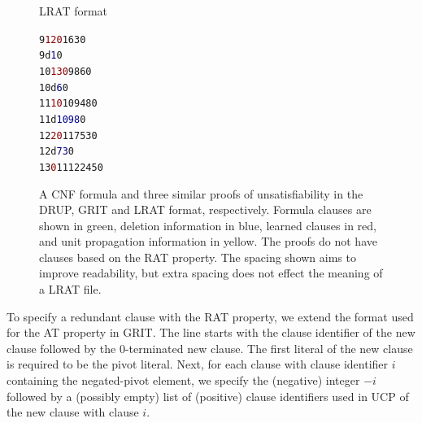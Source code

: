\documentclass{article}
\begin{document}
\begin{figure}[t]
\begin{minipage}[t]{0.32\textwidth}
  \end{minipage}
  \begin{minipage}[t]{0.2425\textwidth}
LRAT format%
    \begin{alltt}
 9 \textcolor{darkred}{1 2 0}       \textcolor{darkyellow}{1 6 3} 0
 9               d \textcolor{darkblue}{1} 0
10 \textcolor{darkred}{1 3 0}       \textcolor{darkyellow}{9 8 6} 0
10               d \textcolor{darkblue}{6} 0
11   \textcolor{darkred}{1 0}    \textcolor{darkyellow}{10 9 4 8} 0
11          d \textcolor{darkblue}{10 9 8} 0
12   \textcolor{darkred}{2 0}    \textcolor{darkyellow}{11 7 5 3} 0
12             d \textcolor{darkblue}{7 3} 0
13     \textcolor{darkred}{0} \textcolor{darkyellow}{11 12 2 4 5} 0
    \end{alltt}
  \end{minipage}
  \caption{A CNF formula and three similar proofs of unsatisfiability
    in the DRUP, GRIT and LRAT format, respectively.  Formula clauses
    are shown in green, deletion information in blue, learned clauses
    in red, and unit propagation information in yellow.  The proofs do
    not have clauses based on the RAT property.  The spacing shown aims to
    improve readability, but extra spacing does not effect the meaning
    of a LRAT file.}
  \label{fig:norat}
\end{figure}

To specify a redundant clause with the RAT property, we extend the
format used for the AT property in GRIT.  The line starts with the
clause identifier of the new clause followed by the 0-terminated new
clause.  The first literal of the new clause is required to be the
pivot literal. Next, for each clause with clause identifier $i$
containing the negated-pivot element, we specify the (negative)
integer $-i$ followed by a (possibly empty) list of (positive) clause
identifiers used in UCP of the new clause with clause $i$.
\end{document}
